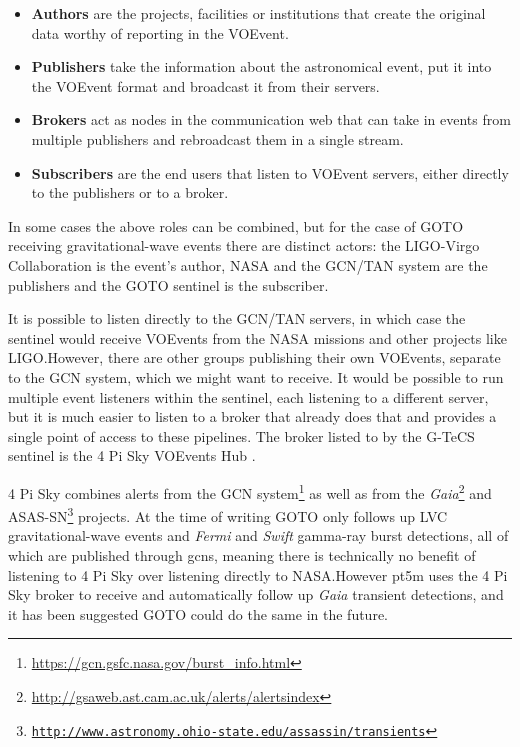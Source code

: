 \begin{colsection}
\begin{colsection}
\begin{itemize}
    \item \textbf{Authors} are the projects, facilities or institutions that create the original data worthy of reporting in the VOEvent.
    \item \textbf{Publishers} take the information about the astronomical event, put it into the VOEvent format and broadcast it from their servers.
    \item \textbf{Brokers} act as nodes in the communication web that can take in events from multiple publishers and rebroadcast them in a single stream.
    \item \textbf{Subscribers} are the end users that listen to VOEvent servers, either directly to the publishers or to a broker.
\end{itemize}

In some cases the above roles can be combined, but for the case of GOTO receiving gravitational-wave events there are distinct actors: the LIGO-Virgo Collaboration is the event's author, NASA and the GCN/TAN system are the publishers and the GOTO sentinel is the subscriber.

It is possible to listen directly to the GCN/TAN servers, in which case the sentinel would receive VOEvents from the NASA missions and other projects like LIGO.\@ However, there are other groups publishing their own VOEvents, separate to the GCN system, which we might want to receive. It would be possible to run multiple event listeners within the sentinel, each listening to a different server, but it is much easier to listen to a broker that already does that and provides a single point of access to these pipelines. The broker listed to by the G-TeCS sentinel is the 4 Pi Sky VOEvents Hub \citep{4pisky}.

\newpage

4 Pi Sky combines alerts from the GCN system\footnote{\url{https://gcn.gsfc.nasa.gov/burst_info.html}} as well as from the \textit{Gaia}\footnote{\url{http://gsaweb.ast.cam.ac.uk/alerts/alertsindex}} and ASAS-SN\footnote{\href{http://www.astronomy.ohio-state.edu/~assassin/transients}{\texttt{http://www.astronomy.ohio-state.edu/\raisebox{0.5ex}{\texttildelow}assassin/transients}}} projects. At the time of writing GOTO only follows up LVC gravitational-wave events and \textit{Fermi} and \textit{Swift} gamma-ray burst detections, all of which are published through \glspl{gcn}, meaning there is technically no benefit of listening to 4 Pi Sky over listening directly to NASA.\@ However pt5m uses the 4 Pi Sky broker to receive and automatically follow up \textit{Gaia} transient detections, and it has been suggested GOTO could do the same in the future.


\end{colsection}
\end{colsection}
